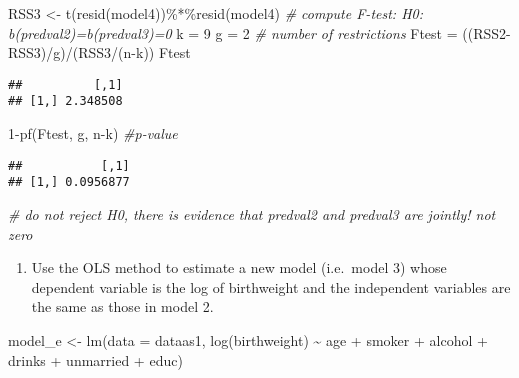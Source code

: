 \documentclass[
]{article}
\newenvironment{Shaded}{\begin{snugshade}}{\end{snugshade}}
\newcommand{\AttributeTok}[1]{\textcolor[rgb]{0.77,0.63,0.00}{#1}}
\newcommand{\CommentTok}[1]{\textcolor[rgb]{0.56,0.35,0.01}{\textit{#1}}}
\newcommand{\DecValTok}[1]{\textcolor[rgb]{0.00,0.00,0.81}{#1}}
\newcommand{\FunctionTok}[1]{\textcolor[rgb]{0.00,0.00,0.00}{#1}}
\newcommand{\NormalTok}[1]{#1}
\newcommand{\OtherTok}[1]{\textcolor[rgb]{0.56,0.35,0.01}{#1}}
\newcommand{\SpecialCharTok}[1]{\textcolor[rgb]{0.00,0.00,0.00}{#1}}
\providecommand{\tightlist}{%
  \setlength{\itemsep}{0pt}\setlength{\parskip}{0pt}}
\begin{document}
\begin{Shaded}
\begin{Highlighting}[]
\NormalTok{RSS3 }\OtherTok{\textless{}{-}} \FunctionTok{t}\NormalTok{(}\FunctionTok{resid}\NormalTok{(model4))}\SpecialCharTok{\%*\%}\FunctionTok{resid}\NormalTok{(model4)}
\CommentTok{\# compute F{-}test: H0: b(predval2)=b(predval3)=0}
\NormalTok{k }\OtherTok{=} \DecValTok{9}
\NormalTok{g }\OtherTok{=} \DecValTok{2} \CommentTok{\# number of restrictions}
\NormalTok{Ftest }\OtherTok{=}\NormalTok{ ((RSS2}\SpecialCharTok{{-}}\NormalTok{RSS3)}\SpecialCharTok{/}\NormalTok{g)}\SpecialCharTok{/}\NormalTok{(RSS3}\SpecialCharTok{/}\NormalTok{(n}\SpecialCharTok{{-}}\NormalTok{k))}
\NormalTok{Ftest}
\end{Highlighting}
\end{Shaded}

\begin{verbatim}
##          [,1]
## [1,] 2.348508
\end{verbatim}

\begin{Shaded}
\begin{Highlighting}[]
\DecValTok{1}\SpecialCharTok{{-}}\FunctionTok{pf}\NormalTok{(Ftest, g, n}\SpecialCharTok{{-}}\NormalTok{k) }\CommentTok{\#p{-}value}
\end{Highlighting}
\end{Shaded}

\begin{verbatim}
##           [,1]
## [1,] 0.0956877
\end{verbatim}

\begin{Shaded}
\begin{Highlighting}[]
\CommentTok{\# do not reject H0, there is evidence that predval2 and predval3 are jointly! not zero}
\end{Highlighting}
\end{Shaded}

\normalsize

\begin{enumerate}
\def\labelenumi{\alph{enumi}.}
\setcounter{enumi}{4}
\tightlist
\item
  Use the OLS method to estimate a new model (i.e.~model 3) whose
  dependent variable is the log of birthweight and the independent
  variables are the same as those in model 2.
\end{enumerate}

\small

\begin{Shaded}
\begin{Highlighting}[]
\NormalTok{model\_e }\OtherTok{\textless{}{-}} \FunctionTok{lm}\NormalTok{(}\AttributeTok{data =}\NormalTok{ dataas1, }\FunctionTok{log}\NormalTok{(birthweight) }\SpecialCharTok{\textasciitilde{}}\NormalTok{ age }\SpecialCharTok{+}\NormalTok{ smoker }\SpecialCharTok{+}\NormalTok{ alcohol }\SpecialCharTok{+}
\NormalTok{                 drinks }\SpecialCharTok{+}\NormalTok{ unmarried }\SpecialCharTok{+}\NormalTok{ educ)}
\end{Highlighting}
\end{Shaded}
\end{document}
